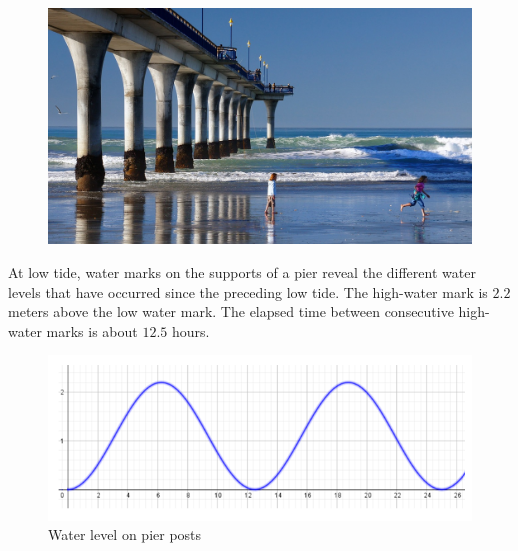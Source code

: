 \documentclass[10pt,]{book}
\theoremstyle{ptxdefinitionnotitle}
\theoremstyle{ptxdefinitiontitle}
\numberwithin{equation}{section}
\begin{document}
\begin{example}\label{example-3}
\leavevmode%
\begin{figure}
\centering
\includegraphics[width=1\linewidth]{./src/images/chapter02/chapter02section01-example03-image.jpg}
\caption{\label{chapter02-section01-example03-image}}
\end{figure}
\hypertarget{p-28}{}%
At low tide, water marks on the supports of a pier reveal the different water levels that have occurred since the preceding low tide. The high-water mark is \(2.2\) meters above the low water mark. The elapsed time between consecutive high-water marks is about \(12.5\) hours.%
\begin{figure}
\centering
\includegraphics[width=1\linewidth]{./src/images/chapter02/chapter02section01-example03-graph.png}
\caption{Water level on pier posts\label{chapter02-section01-example03-graph}}
\end{figure}
\hypertarget{p-29}{}%

\end{example}
\end{document}
